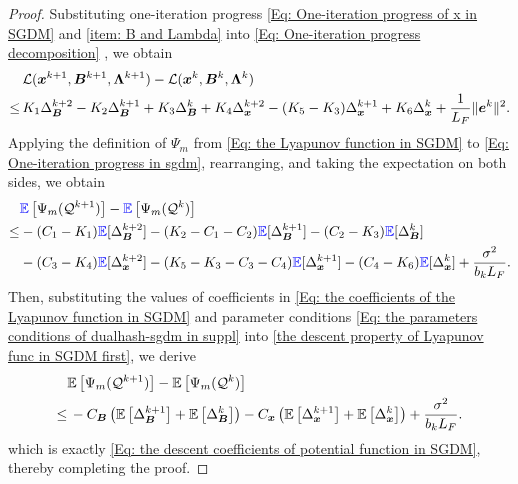 \begin{proof}
    Substituting one-iteration progress \eqref{Eq: One-iteration progress of x in SGDM}
    and \eqref{item: B and Lambda} into \eqref{Eq: One-iteration progress decomposition}
    , we obtain
    \begin{align}
        \label{Eq: One-iteration progress in sgdm} & \calL (\bx^{k+1}, \bB^{k+1}, \bLmbd^{k+1}) - \calL (\bx^{k}, \bB^{k}, \bLmbd^{k}) \notag                                                                                                   \\
        \leq \,                                    & K_{1}\Delta_{\bB}^{k+2}- K_{2}\Delta_{\bB}^{k+1}+ K_{3}\Delta_{\bB}^{k}+ K_{4}\Delta_{\bx}^{k+2}- (K_{5}- K_{3})\Delta_{\bx}^{k+1}+ K_{6}\Delta_{\bx}^{k}+ \frac{1}{L_{F}}\|\be^{k}\|^{2}.
    \end{align}
    Applying the definition of $\Psi_m$ from \eqref{Eq: the Lyapunov function in SGDM}
    to \eqref{Eq: One-iteration progress in sgdm}, rearranging, and taking the
    expectation on both sides, we obtain
    {\small
    \begin{align}
        \label{the descent property of Lyapunov func in SGDM first} & \blue{\EE}\left[\Psi_m(\mathcal{Q}^{k+1})\right] - \blue{\EE}\left[\Psi_m(\mathcal{Q}^{k})\right]\notag                                                                               \\
        \leq                                                        & - (C_{1}- K_{1}) \blue{\EE}[\Delta_{\bm{B}}^{k+2}] -(K_{2}- C_{1}- C_{2}) \blue{\EE}[\Delta_{\bm{B}}^{k+1}] - (C_{2}- K_{3}) \blue{\EE}[\Delta_{\bm{B}}^{k}] \notag                     \\
                                                                    & - (C_{3}-K_{4}) \blue{\EE}[\Delta_{\bx}^{k+2}]- (K_{5}-K_{3}-C_{3}-C_{4}) \blue{\EE}[\Delta_{\bx}^{k+1}] - (C_{4}- K_{6}) \blue{\EE}[\Delta_{\bx}^{k}] + \frac{\sigma^{2}}{b_{k}L_{F}}.
    \end{align}}Then,  substituting the values of coefficients in \eqref{Eq: the coefficients of the Lyapunov function in SGDM}
    and parameter conditions \eqref{Eq: the parameters conditions of dualhash-sgdm in suppl}
    into \eqref{the descent property of Lyapunov func in SGDM first}, we derive
    \begin{align*}
             & \mathbb{E}\left[\Psi_m(\mathcal{Q}^{k+1})\right] - \mathbb{E}\left[\Psi_m(\mathcal{Q}^{k})\right] \nonumber                                                                                                                                                        \\
        \leq & \, -C_{\bm{B}}\left( \mathbb{E}\left[\Delta_{\bm{B}}^{k+1}\right] + \mathbb{E}\left[\Delta_{\bm{B}}^{k}\right] \right) -C_{\bm{x}}\left( \mathbb{E}\left[\Delta_{\bm{x}}^{k+1}\right]+ \mathbb{E}\left[\Delta_{\bm{x}}^{k}\right] \right) + \frac{\sigma^{2}}{b_{k}L_{F}}.
    \end{align*}which is exactly \eqref{Eq: the descent coefficients of potential function in SGDM},
    thereby completing the proof. 
\end{proof}
